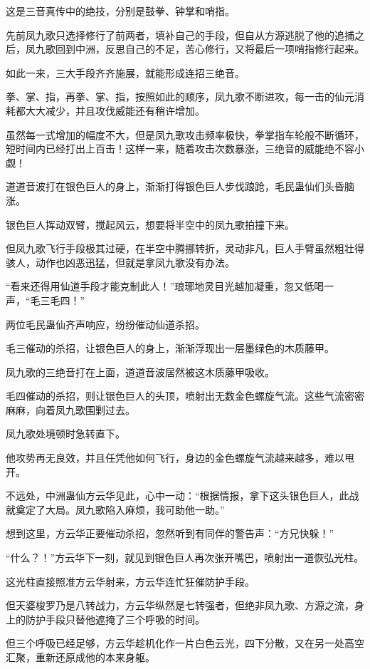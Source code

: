 \begin{this_body}
这是三音真传中的绝技，分别是鼓拳、钟掌和哨指。

先前凤九歌只选择修行了前两者，填补自己的手段，但自从方源逃脱了他的追捕之后，凤九歌回到中洲，反思自己的不足，苦心修行，又将最后一项哨指修行起来。

如此一来，三大手段齐齐施展，就能形成连招三绝音。

拳、掌、指，再拳、掌、指，按照如此的顺序，凤九歌不断进攻，每一击的仙元消耗都大大减少，并且攻伐威能还有稍许增加。

虽然每一式增加的幅度不大，但是凤九歌攻击频率极快，拳掌指车轮般不断循环，短时间内已经打出上百击！这样一来，随着攻击次数暴涨，三绝音的威能绝不容小觑！

道道音波打在银色巨人的身上，渐渐打得银色巨人步伐踉跄，毛民蛊仙们头昏脑涨。

银色巨人挥动双臂，搅起风云，想要将半空中的凤九歌拍撞下来。

但凤九歌飞行手段极其过硬，在半空中腾挪转折，灵动非凡，巨人手臂虽然粗壮得骇人，动作也凶恶迅猛，但就是拿凤九歌没有办法。

“看来还得用仙道手段才能克制此人！”琅琊地灵目光越加凝重，忽又低喝一声，“毛三毛四！”

两位毛民蛊仙齐声响应，纷纷催动仙道杀招。

毛三催动的杀招，让银色巨人的身上，渐渐浮现出一层墨绿色的木质藤甲。

凤九歌的三绝音打在上面，道道音波居然被这木质藤甲吸收。

毛四催动的杀招，则让银色巨人的头顶，喷射出无数金色螺旋气流。这些气流密密麻麻，向着凤九歌围剿过去。

凤九歌处境顿时急转直下。

他攻势再无良效，并且任凭他如何飞行，身边的金色螺旋气流越来越多，难以甩开。

不远处，中洲蛊仙方云华见此，心中一动：“根据情报，拿下这头银色巨人，此战就奠定了大局。凤九歌陷入麻烦，我可助他一助。”

想到这里，方云华正要催动杀招，忽然听到有同伴的警告声：“方兄快躲！”

“什么？！”方云华下一刻，就见到银色巨人再次张开嘴巴，喷射出一道恢弘光柱。

这光柱直接照准方云华射来，方云华连忙狂催防护手段。

但天婆梭罗乃是八转战力，方云华纵然是七转强者，但绝非凤九歌、方源之流，身上的防护手段只替他遮掩了三个呼吸的时间。

但三个呼吸已经足够，方云华趁机化作一片白色云光，四下分散，又在另一处高空汇聚，重新还原成他的本来身躯。


\end{this_body}
